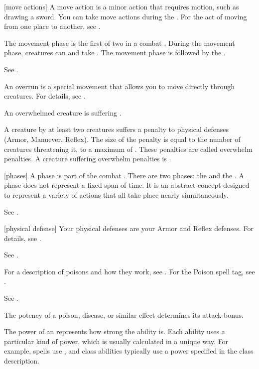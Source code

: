 [move actions] A move action is a minor action that requires motion, such as drawing a sword.
You can take move actions during the .
For the act of moving from one place to another, see .

 The movement phase is the first of two  in a combat .
During the movement phase, creatures can  and take .
The movement phase is followed by the .

 See .

 An overrun is a special movement that allows you to move directly through creatures.
For details, see .

 An overwhelmed creature is suffering .

 A creature  by at least two creatures suffers a penalty to physical defenses (Armor, Manuever, Reflex).
The size of the penalty is equal to the number of creatures threatening it, to a maximum of .
These penalties are called overwhelm penalties.
A creature suffering overwhelm penalties is .

[phases] A phase is part of the combat .
There are two phases: the  and the .
A phase does not represent a fixed span of time.
It is an abstract concept designed to represent a variety of actions that all take place nearly simultaneously.

 See .

[physical defense] Your physical defenses are your Armor and Reflex defenses.
For details, see .

 See .

 For a description of poisons and how they work, see . For the Poison spell tag, see .

 See .

 The potency of a poison, disease, or similar effect determines its attack bonus.

 The power of an  represents how strong the ability is.
Each ability uses a particular kind of power, which is usually calculated in a unique way.
For example, spells use , and class abilities typically use a power specified in the class description.

